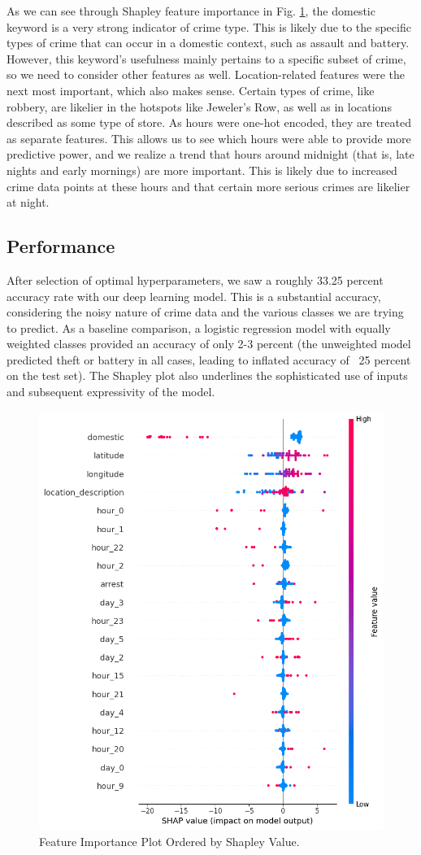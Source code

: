 \documentclass{article}
\begin{document}
As we can see through Shapley feature importance in Fig. \ref{fig:feature-importance}, the domestic keyword is a very strong indicator of crime type. This is likely due to the specific types of crime that can occur in a domestic context, such as assault and battery. However, this keyword's usefulness mainly pertains to a specific subset of crime, so we need to consider other features as well. 
Location-related features were the next most important, which also makes sense. Certain types of crime, like robbery, are likelier in the hotspots like Jeweler's Row, as well as in locations described as some type of store. 
As hours were one-hot encoded, they are treated as separate features. This allows us to see which hours were able to provide more predictive power, and we realize a trend that hours around midnight (that is, late nights and early mornings) are more important. This is likely due to increased crime data points at these hours and that certain more serious crimes are likelier at night. 
\subsection{Performance}
After selection of optimal hyperparameters, we saw a roughly 33.25 percent accuracy rate with our deep learning model. This is a substantial accuracy, considering the noisy nature of crime data and the various classes we are trying to predict. As a baseline comparison, a logistic regression model with equally weighted classes provided an accuracy of only 2-3 percent (the unweighted model predicted theft or battery in all cases, leading to inflated accuracy of ~25 percent on the test set). 
The Shapley plot also underlines the sophisticated use of inputs and subsequent expressivity of the model. 

\begin{figure}[h]
    \centering
    \includegraphics[width=0.5\linewidth]{deep-learning-im/feature-importance.png}
    \caption{Feature Importance Plot Ordered by Shapley Value.}
    \label{fig:feature-importance}
\end{figure}

\end{document}

